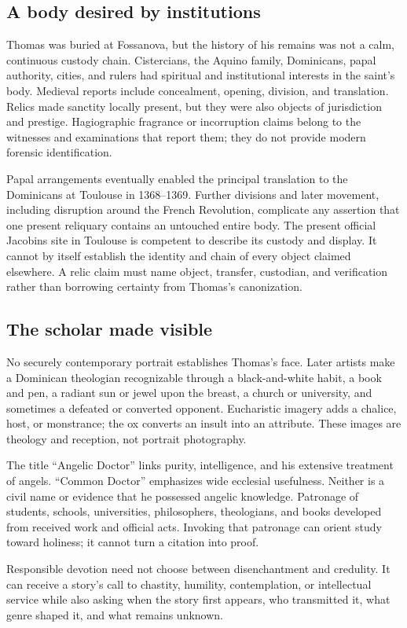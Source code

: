 \subsection{A body desired by institutions}

Thomas was buried at Fossanova, but the history of his remains was not a calm,
continuous custody chain.  Cistercians, the Aquino family, Dominicans, papal
authority, cities, and rulers had spiritual and institutional interests in the
saint's body.  Medieval reports include concealment, opening, division, and
translation.  Relics made sanctity locally present, but they were also objects
of jurisdiction and prestige.  Hagiographic fragrance or incorruption claims
belong to the witnesses and examinations that report them; they do not provide
modern forensic identification.

Papal arrangements eventually enabled the principal translation to the
Dominicans at Toulouse in 1368--1369.  Further divisions and later movement,
including disruption around the French Revolution, complicate any assertion
that one present reliquary contains an untouched entire body.  The present
official Jacobins site in Toulouse is competent to describe its custody and
display.  It cannot by itself establish the identity and chain of every object
claimed elsewhere.  A relic claim must name object, transfer, custodian, and
verification rather than borrowing certainty from Thomas's canonization.

\subsection{The scholar made visible}

No securely contemporary portrait establishes Thomas's face.  Later artists
make a Dominican theologian recognizable through a black-and-white habit, a
book and pen, a radiant sun or jewel upon the breast, a church or university,
and sometimes a defeated or converted opponent.  Eucharistic imagery adds a
chalice, host, or monstrance; the ox converts an insult into an attribute.
These images are theology and reception, not portrait photography.

The title ``Angelic Doctor'' links purity, intelligence, and his extensive
treatment of angels.  ``Common Doctor'' emphasizes wide ecclesial usefulness.
Neither is a civil name or evidence that he possessed angelic knowledge.
Patronage of students, schools, universities, philosophers, theologians, and
books developed from received work and official acts.  Invoking that patronage
can orient study toward holiness; it cannot turn a citation into proof.

Responsible devotion need not choose between disenchantment and credulity.  It
can receive a story's call to chastity, humility, contemplation, or intellectual
service while also asking when the story first appears, who transmitted it,
what genre shaped it, and what remains unknown.
